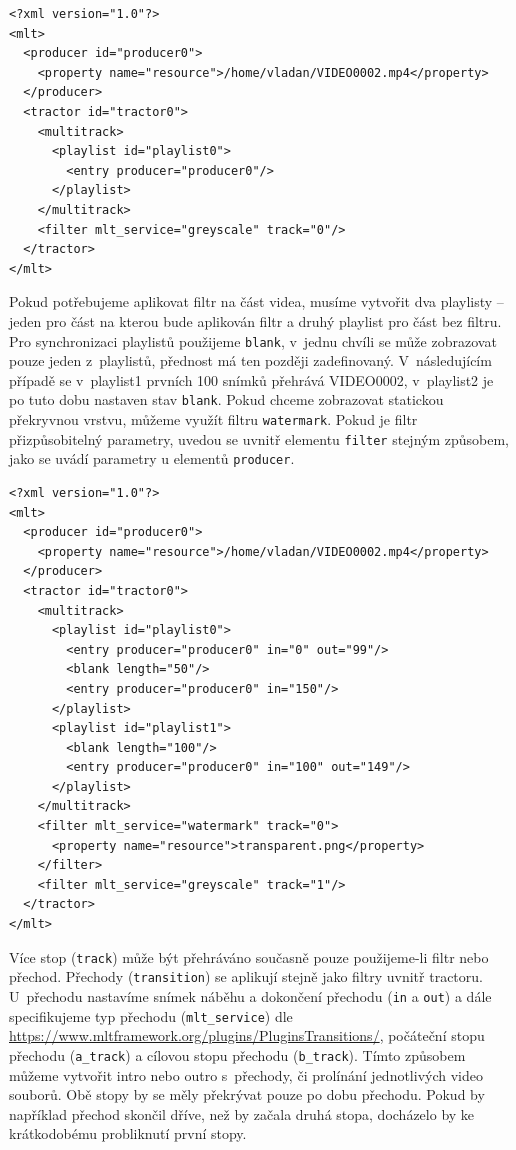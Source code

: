 \begin{lstlisting}[style=xml]
<?xml version="1.0"?>
<mlt>
  <producer id="producer0">
    <property name="resource">/home/vladan/VIDEO0002.mp4</property>
  </producer>
  <tractor id="tractor0">
    <multitrack>
      <playlist id="playlist0">
        <entry producer="producer0"/>
      </playlist>
    </multitrack>
    <filter mlt_service="greyscale" track="0"/>
  </tractor>
</mlt>
\end{lstlisting}
Pokud potřebujeme aplikovat filtr na část videa, musíme vytvořit dva playlisty -- jeden pro část na kterou bude aplikován filtr a druhý playlist pro část bez filtru. Pro synchronizaci playlistů použijeme \texttt{blank}, v~jednu chvíli se může zobrazovat pouze jeden z~playlistů, přednost má ten později zadefinovaný. V~následujícím případě se v~playlist1 prvních 100 snímků přehrává VIDEO0002, v~playlist2 je po tuto dobu nastaven stav \texttt{blank}. Pokud chceme zobrazovat statickou překryvnou vrstvu, můžeme využít filtru \texttt{watermark}. Pokud je filtr přizpůsobitelný parametry, uvedou se uvnitř elementu \texttt{filter} stejným způsobem, jako se uvádí parametry u elementů \texttt{producer}.
\begin{lstlisting}[style=xml]
<?xml version="1.0"?>
<mlt>
  <producer id="producer0">
    <property name="resource">/home/vladan/VIDEO0002.mp4</property>
  </producer>
  <tractor id="tractor0">
    <multitrack>
      <playlist id="playlist0">
        <entry producer="producer0" in="0" out="99"/>
        <blank length="50"/>
        <entry producer="producer0" in="150"/>
      </playlist>
      <playlist id="playlist1">
        <blank length="100"/>
        <entry producer="producer0" in="100" out="149"/>
      </playlist>
    </multitrack>
    <filter mlt_service="watermark" track="0">
      <property name="resource">transparent.png</property>
    </filter>
    <filter mlt_service="greyscale" track="1"/>
  </tractor>
</mlt>
\end{lstlisting}
Více stop (\texttt{track}) může být přehráváno současně pouze použijeme-li filtr nebo přechod. Přechody (\texttt{transition}) se aplikují stejně jako filtry uvnitř tractoru. U~přechodu nastavíme snímek náběhu a dokončení přechodu (\texttt{in} a \texttt{out}) a dále specifikujeme typ přechodu (\texttt{mlt\_service}) dle \url{https://www.mltframework.org/plugins/PluginsTransitions/}, počáteční stopu přechodu (\texttt{a\_track}) a cílovou stopu přechodu (\texttt{b\_track}). Tímto způsobem můžeme vytvořit intro nebo outro s~přechody, či prolínání jednotlivých video souborů. Obě stopy by se měly překrývat pouze po dobu přechodu. Pokud by například přechod skončil dříve, než by začala druhá stopa, docházelo by ke krátkodobému probliknutí první stopy.
